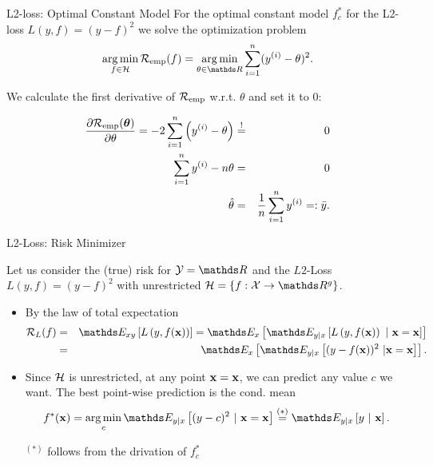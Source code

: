 \documentclass[11pt,compress,t,notes=noshow, xcolor=table]{beamer}
\begin{document}
\begin{vbframe}{L2-loss: Optimal Constant Model}
For the optimal constant model $f_{c}^{\ast}$ for the L2-loss $L(y,f) = \left(y - f\right)^2$ we solve the optimization problem 
$$
\argmin_{f \in \Hspace} \riskef = \argmin_{\theta \in \R} \sumin (\yi - \theta)^2. 
$$


We calculate the first derivative of $\mathcal{R}_{\text{emp}}$ w.r.t. $\theta$ and set it to $0$: 


\begin{eqnarray*}
\frac{\partial \mathcal{R}_{\text{emp}}(\bm{\theta})}{\partial \theta} = -2 \sum\limits_{i=1}^n \left(y^{(i)} - \theta\right) &\overset{!}{=}& 0 \\
\sum\limits_{i=1}^n y^{(i)} - n \theta&=& 0 \\
\hat \theta&=& \frac{1}{n} \sum\limits_{i=1}^n y^{(i)} =: \bar y.
\end{eqnarray*}


\end{vbframe}

\begin{vbframe}{L2-Loss: Risk Minimizer}

Let us consider the (true) risk for  $\Yspace = \R$ and the $L2$-Loss $L(y,f) = \left(y-f\right)^2$ with unrestricted $\Hspace = \{f: \Xspace \to \R^g\}$. 

\begin{itemize}
\item By the law of total expectation
  \begin{eqnarray*}
    \risk_L(f) &=& \E_{xy} \left[\Lxy\right] 
    = \E_x \left[\E_{y|x}\left[\Lxy~|~\xv = \xv\right]\right] \\
  &=& \E_x
  \left[\E_{y|x}\left[(y-\fx)^2~|\xv = \xv\right]\right]. 
  \end{eqnarray*}

\item Since $\mathcal{H}$ is unrestricted, at any point $\mathbf{x} = \mathbf{x}$, we can predict any value $c$ we want. The best point-wise prediction is the cond. mean
$$
  \fxbayes = \argmin_c \E_{y|x}\left[(y - c)^2 ~|~ \xv = \xv \right]\overset{(*)}{=} \E_{y|x} \left[y ~|~ \xv \right]. 
$$

\begin{footnotesize}
$^{(*)}$ follows from the drivation of $f_{c}^{\ast}$
\end{footnotesize}

\end{itemize}


\end{vbframe}
\end{document}
